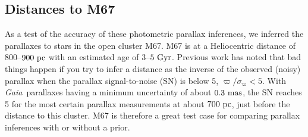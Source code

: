 \documentclass[modern]{aastex61}
\newcommand{\project}[1]{\textsl{#1}}
\newcommand{\gaia}{\project{Gaia}}
\begin{document}
\subsection{Distances to M67}
As a test of the accuracy of these photometric parallax inferences, we inferred the parallaxes to stars in the open cluster M67.
M67 is at a Heliocentric distance of $800$--$900~{\rm pc}$ with an estimated age of $3$--$5~{\rm Gyr}$.
Previous work \citep{cbj15} has noted that bad things happen if you try to infer a distance as the inverse of the observed (noisy) parallax when the parallax signal-to-noise (SN) is below 5, $\varpi / \sigma_\varpi < 5$.
With \gaia\ parallaxes having a minimum uncertainty of about $0.3~{\rm mas}$, the SN reaches 5 for the most certain parallax measurements at about $700~{\rm pc}$, just before the distance to this cluster.
M67 is therefore a great test case for comparing parallax inferences with or without a prior.
\end{document}
